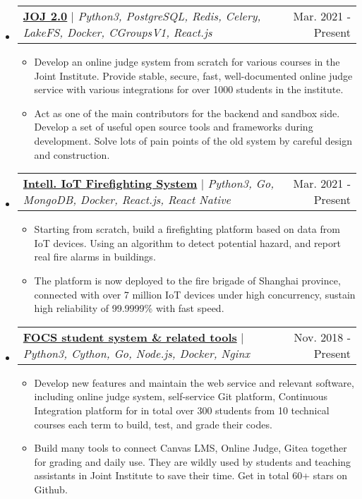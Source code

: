 \documentclass[letterpaper,11pt]{article}
\makeatletter
\newcommand{\resumeItem}[1]{
  \item\small{
    {#1 \vspace{-2pt}}
  }
}
\newcommand{\resumeProjectHeading}[2]{
    \item
    \begin{tabular*}{0.97\textwidth}{l@{\extracolsep{\fill}}r}
      \small#1 & #2 \\
    \end{tabular*}\vspace{-7pt}
}
\newcommand{\resumeSubHeadingListStart}{\begin{itemize}[leftmargin=0.15in, label={}]}
\newcommand{\resumeSubHeadingListEnd}{\end{itemize}}
\newcommand{\resumeItemListStart}{\begin{itemize}}
\newcommand{\resumeItemListEnd}{\end{itemize}\vspace{-5pt}}
\makeatother
\begin{document}
    \resumeSubHeadingListStart
      \resumeProjectHeading
        {\href{https://github.com/joint-online-judge}{\textbf{JOJ 2.0}} $|$ \emph{Python3, PostgreSQL, Redis, Celery, LakeFS, Docker, CGroupsV1, React.js}}{Mar. 2021 - Present}
        \resumeItemListStart
          \resumeItem{Develop an online judge system from scratch for various courses
          in the Joint Institute. Provide stable, secure, fast, well-documented online judge service with various integrations for over 1000 students in the institute.}
          \resumeItem{Act as one of the main contributors for the backend and sandbox side. Develop a set of useful open source tools and frameworks during development. Solve lots of pain points of the old system by careful design and construction.}
        \resumeItemListEnd
      \resumeProjectHeading
        {\href{https://github.com/SJTU-IPP-Firefighting}{\textbf{Intell. IoT Firefighting System}} $|$ \emph{Python3, Go, MongoDB, Docker, React.js, React Native}}{Mar. 2021 - Present}
        \resumeItemListStart
          \resumeItem{Starting from scratch, build a firefighting platform based on data from IoT devices. Using an algorithm to detect potential hazard, and report real fire alarms in buildings.}
          \resumeItem{The platform is now deployed to the fire brigade of Shanghai province, connected with over 7 million IoT devices under high concurrency, sustain high reliability of 99.9999\% with fast speed.}
        \resumeItemListEnd
      \resumeProjectHeading
        {\href{https://gist.github.com/BoYanZh/fc4469c20fd6adf42c212114532aaac0}{\textbf{FOCS student system \& related tools}} $|$ \emph{Python3, Cython, Go, Node.js, Docker, Nginx}}{Nov. 2018 - Present}
        \resumeItemListStart
          \resumeItem{Develop new features and maintain the web service and relevant software, including online judge system, self-service Git platform, Continuous Integration platform for in total over 300 students from 10 technical courses each term to build, test, and grade their codes.}
          \resumeItem{Build many tools to connect Canvas LMS, Online Judge, Gitea together for grading and daily use. They are wildly used by students and teaching assistants in Joint Institute to save their time. Get in total 60+ stars on Github.}
        \resumeItemListEnd
    \resumeSubHeadingListEnd


%
\end{document}
